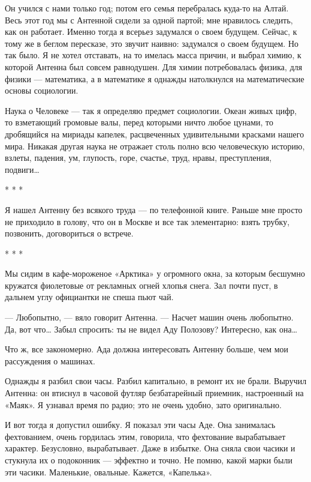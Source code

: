 Он учился с нами только год; потом его семья перебралась куда-то на Алтай.
Весь этот год мы с Антенной сидели за одной партой; мне нравилось следить,
как он работает. Именно тогда я всерьез задумался о своем будущем. Сейчас,
к тому  же  в беглом  пересказе,  это  звучит наивно:  задумался  о  своем
будущем. Но так было. Я не хотел отставать, на то имелась масса причин,  и
выбрал  химию,  к  которой  Антенна  был  совсем  равнодушен.  Для   химии
потребовалась физика, для физики  — математика, а  в математике я  однажды
натолкнулся на математические основы социологии.

Наука о  Человеке —  так я определяю  предмет социологии.  Океан живых
цифр, то взметающий громовые валы,  перед которыми ничто любое цунами,
то дробящийся на мириады  капелек, расцвеченных удивительными красками
нашего  мира.  Никакая  другая  наука  не  отражает  столь  полно  всю
человеческую историю,  взлеты, падения,  ум, глупость,  горе, счастье,
труд, нравы, преступления, подвиги…

* * *

Я нашел Антенну без всякого труда — по телефонной книге. Раньше мне просто
не приходило  в голову,  что он  в  Москве и  все так  элементарно:  взять
трубку, позвонить, договориться о встрече.

* * *

Мы сидим в кафе-мороженое «Арктика» у огромного окна, за которым  бесшумно
кружатся фиолетовые от  рекламных огней  хлопья снега. Зал  почти пуст,  в
дальнем углу официантки не спеша пьют чай.

— Любопытно, — вяло говорит Антенна.  — Насчет машин очень любопытно.  Да,
вот что… Забыл спросить: ты не видел Аду Полозову? Интересно, как она…

Что ж, все закономерно.  Ада должна интересовать  Антенну больше, чем  мои
рассуждения о машинах.

Однажды я  разбил свои  часы. Разбил  капитально, в  ремонт их  не  брали.
Выручил Антенна:  он  втиснул  в часовой  футляр  безбатарейный  приемник,
настроенный на «Маяк». Я узнавал время по радио; это не очень удобно, зато
оригинально.

И вот тогда  я допустил  ошибку. Я показал  эти часы  Аде. Она  занималась
фехтованием, очень гордилась этим,  говорила, что фехтование  вырабатывает
характер. Безусловно, вырабатывает. Даже в избытке. Она сняла свои  часики
и стукнула их о подоконник — эффектно и точно. Не помню, какой марки  были
эти часики. Маленькие, овальные. Кажется, «Капелька».

